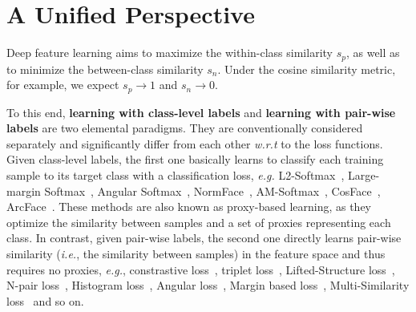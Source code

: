 \documentclass[10pt,twocolumn,letterpaper]{article}
\begin{document}

\section{A Unified Perspective}\label{sec:revisit}
Deep feature learning aims to maximize the within-class similarity $s_p$, as well as to minimize the between-class similarity $s_n$. Under the cosine similarity metric, for example, we expect $s_p\rightarrow1$ and $s_n\rightarrow0$.

To this end, \textbf{learning with class-level labels} and \textbf{learning with pair-wise labels} are two elemental  paradigms. They are conventionally considered separately and significantly differ from each other \emph{w.r.t} to the loss functions. Given class-level labels, the first one basically learns to classify each training sample to its target class with a classification loss, \textit{e.g.} L2-Softmax~\cite{ranjan2017l2}, Large-margin Softmax~\cite{liu2017sphereface}, Angular Softmax~\cite{Liu2016LargeMarginSL}, NormFace~\cite{wang2017normface}, AM-Softmax~\cite{wang2018additive}, CosFace~\cite{Wang_2018_CVPR}, ArcFace~\cite{deng2019arcface}. These methods are also known as proxy-based learning, as they optimize the similarity between samples and a set of proxies representing each class. 
In contrast, given pair-wise labels, the second one directly learns pair-wise similarity (\emph{i.e.}, the similarity between samples) in the feature space and thus requires no proxies, \emph{e.g.}, constrastive loss~\cite{hadsell2006dimensionality,chopra2005learning}, triplet loss~\cite{hoffer2015deep, schroff2015facenet}, Lifted-Structure loss~\cite{oh2016deep}, N-pair loss~\cite{Sohn2016ImprovedDM}, Histogram loss~\cite{Ustinova2016LearningDE}, Angular loss~\cite{Wang2017DeepML}, Margin based loss~\cite{wu2017sampling},  Multi-Similarity loss~\cite{wang2019multi} and so on. 
\end{document}
